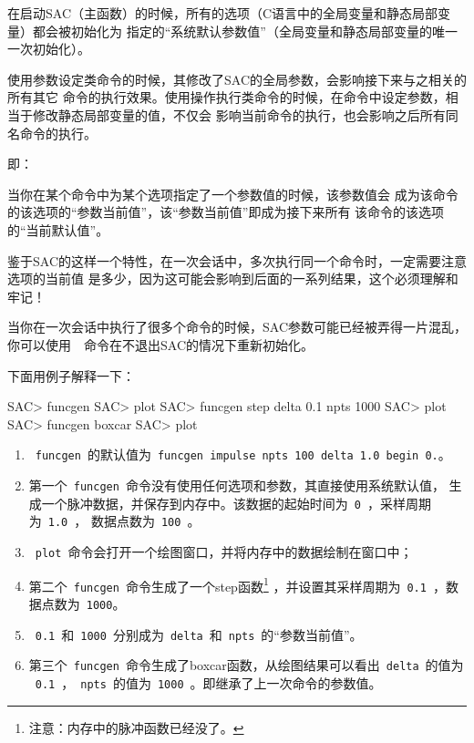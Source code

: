 在启动SAC（主函数）的时候，所有的选项（C语言中的全局变量和静态局部变量）都会被初始化为
指定的``系统默认参数值''（全局变量和静态局部变量的唯一一次初始化）。

使用参数设定类命令的时候，其修改了SAC的全局参数，会影响接下来与之相关的所有其它
命令的执行效果。使用操作执行类命令的时候，在命令中设定参数，相当于修改静态局部变量的值，不仅会
影响当前命令的执行，也会影响之后所有同名命令的执行。

即：

当你在某个命令中为某个选项指定了一个参数值的时候，该参数值会
成为该命令的该选项的``参数当前值''，该``参数当前值''即成为接下来所有
该命令的该选项的``当前默认值''。

鉴于SAC的这样一个特性，在一次会话中，多次执行同一个命令时，一定需要注意选项的当前值
是多少，因为这可能会影响到后面的一系列结果，这个必须理解和牢记！

\begin{Tips}
当你在一次会话中执行了很多个命令的时候，SAC参数可能已经被弄得一片混乱，
你可以使用~~命令在不退出SAC的情况下重新初始化。
\end{Tips}

下面用例子解释一下：
\begin{SACCode}
SAC> funcgen
SAC> plot
SAC> funcgen step delta 0.1 npts 1000
SAC> plot
SAC> funcgen boxcar
SAC> plot
\end{SACCode}

\begin{enumerate}
\item ~\verb+funcgen+~的默认值为~\verb+funcgen impulse npts 100 delta 1.0 begin 0.+。
\item 第一个~\verb+funcgen+~命令没有使用任何选项和参数，其直接使用系统默认值，
    生成一个脉冲数据，并保存到内存中。该数据的起始时间为~\verb+0+~，采样周期为~\verb+1.0+~，
    数据点数为~\verb+100+~。
\item ~\verb+plot+~命令会打开一个绘图窗口，并将内存中的数据绘制在窗口中；
\item 第二个~\verb+funcgen+~命令生成了一个step函数\footnote{注意：内存中的脉冲函数已经没了。}
    ，并设置其采样周期为~\verb+0.1+~，数据点数为~\verb+1000+。
\item ~\verb+0.1+~和~\verb+1000+~分别成为~\verb+delta+~和~\verb+npts+~的``参数当前值''。
\item 第三个~\verb+funcgen+~命令生成了boxcar函数，从绘图结果可以看出~\verb+delta+~的值为
    ~\verb+0.1+~，~\verb+npts+~的值为~\verb+1000+~。即继承了上一次命令的参数值。
\end{enumerate}
